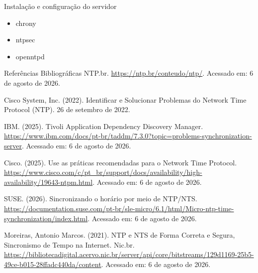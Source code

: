 \documentclass{if-beamer}
\begin{document}
\begin{frame}{Instalação e configuração do servidor}
\begin{itemize}
\item chrony
\item ntpsec
\item openntpd
\end{itemize}

\end{frame}
	
	
	\begin{frame}[allowframebreaks]{Referências Bibliográficas}
NTP.br. \url{https://ntp.br/conteudo/ntp/}. Acessado em: 6 de agosto de 2026.

Cisco System, Inc. (2022). Identificar e Solucionar Problemas do Network Time Protocol (NTP). 26 de setembro de 2022.

IBM. (2025). Tivoli Application Dependency Discovery Manager. \url{https://www.ibm.com/docs/pt-br/taddm/7.3.0?topic=problems-synchronization-server}. Acessado em: 6 de agosto de 2026.

Cisco. (2025). Use as práticas recomendadas para o Network Time Protocol. \url{https://www.cisco.com/c/pt_br/support/docs/availability/high-availability/19643-ntpm.html}. Acessado em: 6 de agosto de 2026.

SUSE. (2026). Sincronizando o horário por meio de NTP/NTS. \url{https://documentation.suse.com/pt-br/sle-micro/6.1/html/Micro-ntp-time-synchronization/index.html}. Acessado em: 6 de agosto de 2026.

Moreiras, Antonio Marcos. (2021). NTP e NTS de Forma Correta e Segura, Sincronismo de Tempo na Internet. Nic.br. \url{https://bibliotecadigital.acervo.nic.br/server/api/core/bitstreams/129d1169-25b5-49ce-b015-28ffadc440da/content}. Acessado em: 6 de agosto de 2026.
	\end{frame}	
	
\end{document}
